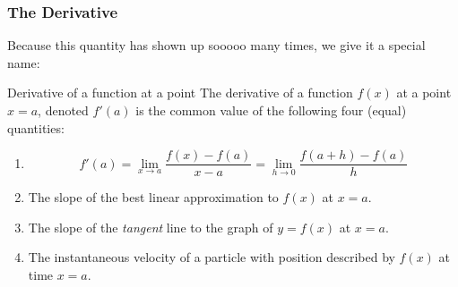 \documentclass{ltx-talk}
\begin{document}
\begin{frame}
  \frametitle{The Derivative}
  Because this quantity has shown up sooooo many times, we give it a special name: \pause

  \begin{block}{Derivative of a function at a point}
    The derivative of a function $f(x)$ at a point $x = a$, denoted $f'(a)$ \pause
    is the common value of the following four (equal) quantities: \pause
    \begin{enumerate}
      \item \begin{equation} \label{eq:derivative} f'(a) = \lim_{x \rightarrow a} \dfrac{f(x) - f(a)}{x - a} = \lim_{h \rightarrow 0} \dfrac{f(a + h) - f(a)}{h} \end{equation} \pause
      \item The slope of the best linear approximation to $f(x)$ at $x = a$. \pause
      \item The slope of the \textit{tangent} line to the graph of $y = f(x)$ at $x = a$. \pause
      \item The instantaneous velocity of a particle with position described by $f(x)$ at time $x = a$.
    \end{enumerate}
  \end{block}
\end{frame}
\end{document}
